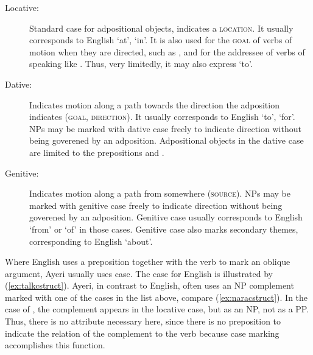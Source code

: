 \begin{description}
	\item[Locative:] Standard case for adpositional
	objects, indicates a
	\textsc{location}. It usually corresponds to English `at', `in'. It is also
	used for the \textsc{goal} of verbs of motion when
	they are directed, such as , and for the addressee of
	verbs of speaking like . Thus, very limitedly, it may
	also express `to'.

	\item[Dative:] Indicates motion along a path towards the direction the
	adposition indicates (\textsc{goal},
	\textsc{direction}). It usually corresponds to English `to', `for'.
	NPs may be marked with dative
	case freely to indicate direction without being goverened
	by an adposition. Adpositional objects in the dative case are limited to the
	prepositions  and .

	\item[Genitive:] Indicates motion along a path from somewhere
	(\textsc{source}). NPs may be marked with genitive case freely to
	indicate direction without being goverened by an adposition. Genitive
	case usually corresponds to English `from' or `of' in
	those cases. Genitive case also marks
	secondary themes, corresponding to English
	`about'.
\end{description}

Where English uses a preposition together with the verb to mark an oblique
argument, Ayeri usually uses case. The case
for English is illustrated by (\ref{ex:talkcstruct}). Ayeri, in contrast to
English, often uses an NP complement marked with one of the cases in the list
above, compare (\ref{ex:naracstruct}). In the case of , the complement appears in the locative case, but as an NP, not as a PP.
Thus, there is no \PCase{} attribute necessary here, since there is no
preposition to indicate the relation of the complement to the verb because case
marking accomplishes this function.

